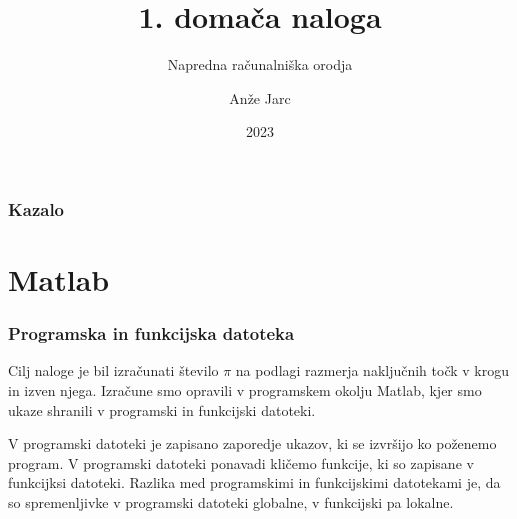 \documentclass{beamer}
\title{1. domača naloga}
\subtitle{Napredna računalniška orodja}
\author{Anže Jarc}
\institute{Fakulteta za strojništvo}
\date{2023}
\begin{document}
\frame{\titlepage}
\begin{frame}
    \frametitle{Kazalo}
    \tableofcontents
\end{frame}

  

\section{Matlab}

\begin{frame}
\frametitle{Programska in funkcijska datoteka}
\justifying
Cilj naloge je bil izračunati število $\pi$ na podlagi razmerja naključnih točk v krogu in izven njega. Izračune smo opravili v programskem okolju Matlab, kjer smo ukaze shranili v programski in funkcijski datoteki.

V programski datoteki je zapisano zaporedje ukazov, ki se izvršijo ko poženemo program. V programski datoteki ponavadi kličemo funkcije, ki so zapisane v funkcijksi datoteki. Razlika med programskimi in funkcijskimi datotekami je, da so spremenljivke v programski datoteki globalne, v funkcijski pa lokalne.
\end{frame}
\end{document}
